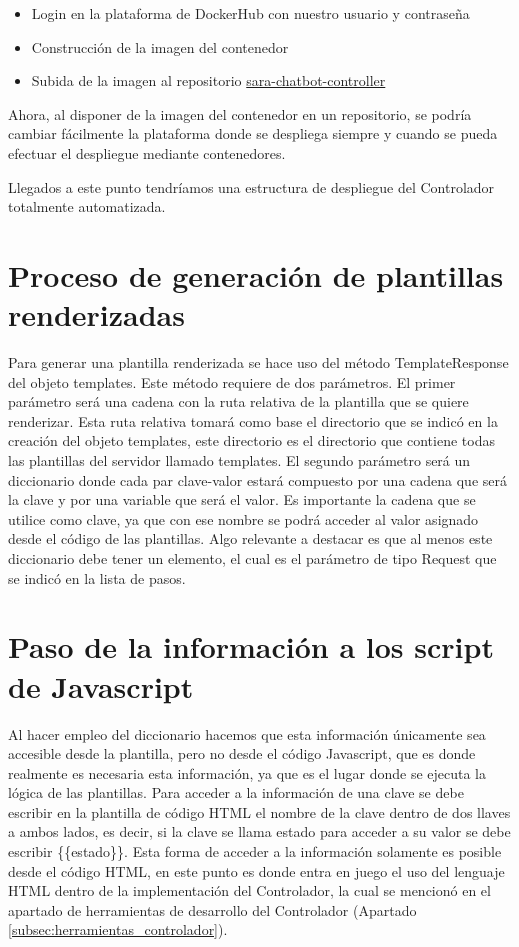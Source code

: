 \begin{itemize}
\item Login en la plataforma de DockerHub con nuestro usuario y contraseña
\item Construcción de la imagen del contenedor
\item Subida de la imagen al repositorio \href{https://hub.docker.com/repository/docker/macarse/sara-chatbot-controller}{sara-chatbot-controller}
\end{itemize}

Ahora, al disponer de la imagen del contenedor en un repositorio, se podría cambiar fácilmente la plataforma donde se despliega siempre y cuando se pueda efectuar el despliegue mediante contenedores.

Llegados a este punto tendríamos una estructura de despliegue del Controlador totalmente automatizada.


\section{Proceso de generación de plantillas renderizadas} \label{sec:proce_gen_plantillas}

Para generar una plantilla renderizada se hace uso del método TemplateResponse del objeto templates. Este método requiere de dos parámetros. El primer parámetro será una cadena con la ruta relativa de la plantilla que se quiere renderizar. Esta ruta relativa tomará como base el directorio que se indicó en la creación del objeto templates, este directorio es el directorio que contiene todas las plantillas del servidor llamado templates. El segundo parámetro será un diccionario donde cada par clave-valor estará compuesto por una cadena que será la clave y por una variable que será el valor. Es importante la cadena que se utilice como clave, ya que con ese nombre se podrá acceder al valor asignado desde el código de las plantillas. Algo relevante a destacar es que al menos este diccionario debe tener un elemento, el cual es el parámetro de tipo Request que se indicó en la lista de pasos.


\section{Paso de la información a los script de Javascript} \label{sec:paso_info_scripts}

Al hacer empleo del diccionario hacemos que esta información únicamente sea accesible desde la plantilla, pero no desde el código Javascript, que es donde realmente es necesaria esta información, ya que es el lugar donde se ejecuta la lógica de las plantillas. Para acceder a la información de una clave se debe escribir en la plantilla de código HTML el nombre de la clave dentro de dos llaves a ambos lados, es decir, si la clave se llama estado para acceder a su valor se debe escribir \{\{estado\}\}. Esta forma de acceder a la información solamente es posible desde el código HTML, en este punto es donde entra en juego el uso del lenguaje HTML dentro de la implementación del Controlador, la cual se mencionó en el apartado de herramientas de desarrollo del Controlador (Apartado \ref{subsec:herramientas_controlador}).

